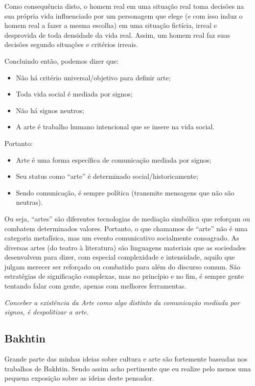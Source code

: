 Como consequência disto, o homem real em uma situação real toma decisões na sua própria vida influenciado por um personagem que elege (e com isso induz o homem real a fazer a mesma escolha) em uma situação fictícia, irreal e desprovida de toda densidade da vida real. Assim, um homem real faz suas decisões segundo situações e critérios irreais.

Concluindo então, podemos dizer que:

\begin{itemize}
    \item Não há critério universal/objetivo para definir arte;
    \item Toda vida social é mediada por signos;
    \item Não há signos neutros;
    \item A arte é trabalho humano intencional que se insere na vida social.
\end{itemize}
Portanto:

\begin{itemize}
    \item Arte é uma forma específica de comunicação mediada por signos;
    \item Seu status como “arte” é determinado social/historicamente;
    \item Sendo comunicação, é sempre política (transmite mensagens que não são neutras).
\end{itemize}
Ou seja, “artes” são diferentes tecnologias de mediação simbólica que reforçam ou combatem determinados valores. Portanto, o que chamamos de “arte” não é uma categoria metafísica, mas um evento comunicativo socialmente consagrado. As diversas artes (do teatro à literatura) são linguagens materiais que as sociedades desenvolvem para dizer, com especial complexidade e intensidade, aquilo que julgam merecer ser reforçado ou combatido para além do discurso comum. São estratégias de significação complexas, mas no princípio e no fim, é sempre gente tentando falar com gente, apenas com melhores ferramentas.

\textit{Conceber a existência da Arte como algo distinto da comunicação mediada por signos, é despolitizar a arte.}

\subsection{Bakhtin}

Grande parte das minhas ideias sobre cultura e arte são fortemente baseadas nos trabalhos de Bakhtin. Sendo assim acho pertinente que eu realize pelo menos uma pequena exposição sobre as ideias deste pensador.

